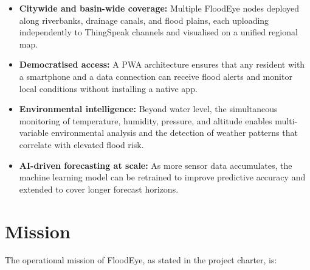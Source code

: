 \begin{itemize}[leftmargin=1.5em]
  \item \textbf{Citywide and basin-wide coverage:} Multiple FloodEye nodes deployed along riverbanks, drainage canals, and flood plains, each uploading independently to ThingSpeak channels and visualised on a unified regional map.
  \item \textbf{Democratised access:} A PWA architecture ensures that any resident with a smartphone and a data connection can receive flood alerts and monitor local conditions without installing a native app.
  \item \textbf{Environmental intelligence:} Beyond water level, the simultaneous monitoring of temperature, humidity, pressure, and altitude enables multi-variable environmental analysis and the detection of weather patterns that correlate with elevated flood risk.
  \item \textbf{AI-driven forecasting at scale:} As more sensor data accumulates, the machine learning model can be retrained to improve predictive accuracy and extended to cover longer forecast horizons.
\end{itemize}

\section{Mission}

The operational mission of FloodEye, as stated in the project charter, is:

